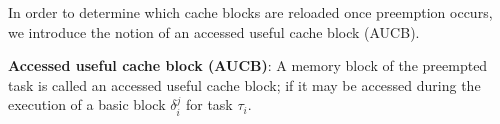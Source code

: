 \noindent
In order to determine which cache blocks are reloaded once preemption occurs, we introduce the notion of an accessed useful cache block (AUCB).

\begin{definition}
\textbf{Accessed useful cache block (AUCB)}: A memory block of the preempted task is called an accessed useful cache block; if it may be accessed during the execution of a basic block \begin{math}\delta_{i}^{j}\end{math} for task \begin{math}\tau_{i}\end{math}.
\end{definition}

